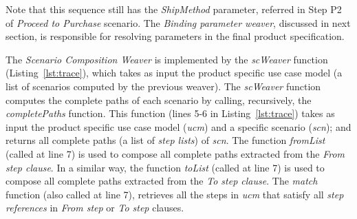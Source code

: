 Note that this sequence still has  the \emph{ShipMethod} parameter,
referred in Step P2 of \emph{Proceed to Purchase} scenario. The \emph{Binding parameter weaver}, discussed in next section, is responsible for resolving parameters in the final
product specification.



The \emph{Scenario Composition Weaver} is implemented by the \emph{scWeaver} function (Listing~\ref{lst:trace}), which takes
as input the product specific use case model (a list of scenarios computed by the previous weaver).
The \emph{scWeaver} function computes the complete paths of each
scenario by calling, recursively, the \emph{completePaths} function. This
function (lines 5-6 in Listing~\ref{lst:trace})
takes as input the product specific use case model (\emph{ucm}) and a specific
scenario (\emph{scn});
and returns all complete paths (a list of \emph{step lists}) of
\emph{scn}. The function \emph{fromList} (called at line 7) is used to
compose all complete paths extracted from the \emph{From step
clause}. In a similar way, the function \emph{toList} (called at
line 7) is used to compose all complete paths extracted from the
\emph{To step clause}. The \emph{match} function (also called at
line 7), retrieves all the steps in \emph{ucm} that satisfy all
\emph{step references} in \emph{From step} or \emph{To step}
clauses.


